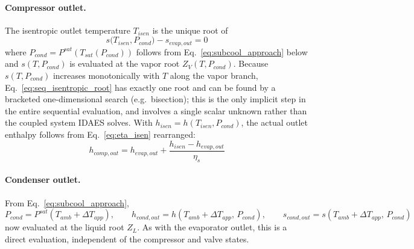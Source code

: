\documentclass{article}
\begin{document}
\paragraph{Compressor outlet.} The isentropic outlet temperature $T_{isen}$
is the unique root of
\begin{equation}\label{eq:seq_isentropic_root}
    s\big(T_{isen}, P_{cond}\big) - s_{evap,out} = 0
\end{equation}
where $P_{cond}=P^{sat}(T_{sat}(P_{cond}))$ follows from
Eq.~\eqref{eq:subcool_approach} below and $s(T,P_{cond})$ is evaluated at
the vapor root $Z_V(T,P_{cond})$. Because $s(T,P_{cond})$ increases
monotonically with $T$ along the vapor branch, Eq.~\eqref{eq:seq_isentropic_root}
has exactly one root and can be found by a bracketed one-dimensional search
(e.g.\ bisection); this is the only implicit step in the entire sequential
evaluation, and involves a single scalar unknown rather than the coupled
system IDAES solves. With $h_{isen}=h(T_{isen},P_{cond})$, the actual
outlet enthalpy follows from Eq.~\eqref{eq:eta_isen} rearranged:
\begin{equation}\label{eq:seq_comp_out}
    h_{comp,out} = h_{evap,out} + \frac{h_{isen} - h_{evap,out}}{\eta_s}
\end{equation}

\paragraph{Condenser outlet.} From Eq.~\eqref{eq:subcool_approach},
\begin{equation}\label{eq:seq_cond_out}
    P_{cond} = P^{sat}\!\left(T_{amb}+\Delta T_{app}\right), \qquad
    h_{cond,out} = h\!\left(T_{amb}+\Delta T_{app},\, P_{cond}\right), \qquad
    s_{cond,out} = s\!\left(T_{amb}+\Delta T_{app},\, P_{cond}\right)
\end{equation}
now evaluated at the liquid root $Z_L$. As with the evaporator outlet,
this is a direct evaluation, independent of the compressor and valve
states.
\end{document}
